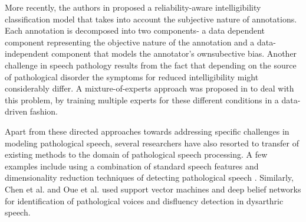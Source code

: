 \documentclass{article}
\begin{document}
More recently, the authors in \cite{kumar2015maxentrel} proposed a reliability-aware intelligibility classification model that takes into account the subjective nature of annotations. Each annotation is decomposed into two components- a data dependent component representing the objective nature of the annotation and a data-independent component that models the annotator's ownsubective bias. 
Another challenge in speech pathology results from the fact that depending on the source of pathological disorder the symptoms for reduced intelligibility might considerably differ. A mixture-of-experts approach was proposed in \cite{gupta2015mixture} to deal with this problem, by training multiple experts for these different conditions in a data-driven fashion.

Apart from these directed approaches towards addressing specific challenges in modeling pathological speech, several researchers have also resorted to transfer of existing methods to the domain of pathological speech processing.
A few examples include using a combination of standard speech features and dimensionality reduction techniques of detecting pathological speech \cite{godino2006dimensionality,umapathy2005feature}.
Similarly, Chen et al. \cite{chen2007svm} and Oue et al. \cite{oueautomatic} used support vector machines and deep belief networks for identification of pathological voices and disfluency detection in dysarthric speech.
\end{document}
